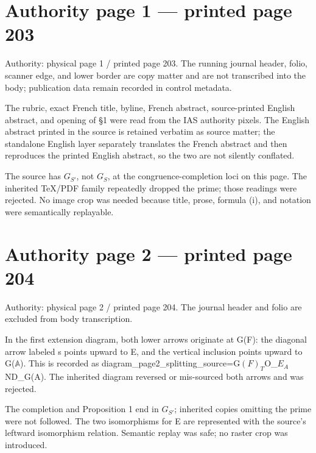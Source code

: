 \documentclass[10pt,a4paper]{article}
\begin{document}
\small
{}\hypertarget{authority-page-0001}{}
\section*{Authority page 1 --- printed page 203}
\noindent Authority: physical page 1 / printed page 203. The running journal header, folio, scanner edge, and lower border are copy matter and are not transcribed into the body; publication data remain recorded in control metadata.\par
\smallskip
\noindent The rubric, exact French title, byline, French abstract, source-printed English abstract, and opening of §1 were read from the IAS authority pixels. The English abstract printed in the source is retained verbatim as source matter; the standalone English layer separately translates the French abstract and then reproduces the printed English abstract, so the two are not silently conflated.\par
\smallskip
\noindent The source has \ensuremath{G_{S′}}, not \ensuremath{G_S}, at the congruence-completion loci on this page. The inherited TeX/PDF family repeatedly dropped the prime; those readings were rejected. No image crop was needed because title, prose, formula (i), and notation were semantically replayable.\par
\clearpage
{}\hypertarget{authority-page-0002}{}
\section*{Authority page 2 --- printed page 204}
\noindent Authority: physical page 2 / printed page 204. The journal header and folio are excluded from body transcription.\par
\smallskip
\noindent In the first extension diagram, both lower arrows originate at G(F): the diagonal arrow labeled s points upward to E, and the vertical inclusion points upward to G(\ensuremath{𝔸}). This is recorded as diagram\allowbreak\_page2\allowbreak\_splitting\allowbreak\_source=G\ensuremath{(F)_T}O\allowbreak\_\ensuremath{E_A}ND\allowbreak\_G(A). The inherited diagram reversed or mis-sourced both arrows and was rejected.\par
\smallskip
\noindent The completion and Proposition 1 end in \ensuremath{G_{S′}}; inherited copies omitting the prime were not followed. The two isomorphisms for E are represented with the source's leftward isomorphism relation. Semantic replay was safe; no raster crop was introduced.\par
\clearpage
{}\hypertarget{authority-page-0003}{}
\end{document}
